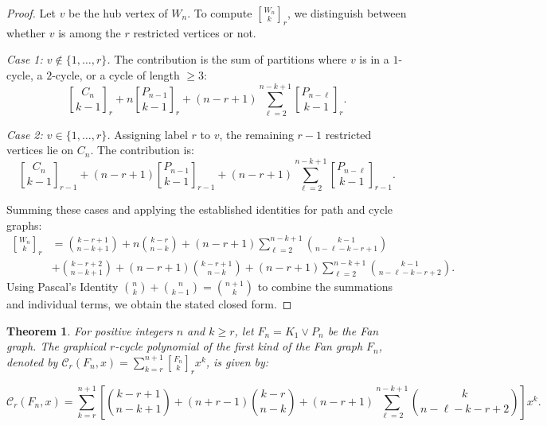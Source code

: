 \documentclass{amsart}
\newcounter{cases}
\newtheorem{theorem}{Theorem}[section]
\theoremstyle{definition}
\begin{document}
\begin{proof}
Let $v$ be the hub vertex of $W_n$. To compute ${W_n \brack k}_r$, we distinguish between whether $v$ is among the $r$ restricted vertices or not.

\textit{Case 1: $v \notin \{1, \dots, r\}$.} The contribution is the sum of partitions where $v$ is in a $1$-cycle, a $2$-cycle, or a cycle of length $\geq 3$:
\[ {C_n \brack k-1}_r + n{P_{n-1} \brack k-1}_r + (n-r+1)\sum_{\ell=2}^{n-k+1}{P_{n-\ell} \brack k-1}_{r}. \]

\textit{Case 2: $v \in \{1, \dots, r\}$.} Assigning label $r$ to $v$, the remaining $r-1$ restricted vertices lie on $C_n$. The contribution is:
\[ {C_n \brack k-1}_{r-1} + (n-r+1){P_{n-1} \brack k-1}_{r-1} + (n-r+1)\sum_{\ell=2}^{n-k+1}{P_{n-\ell} \brack k-1}_{r-1}. \]

Summing these cases and applying the established identities for path and cycle graphs:
\begin{align*}
{W_n \brack k}_r &= \binom{k-r+1}{n-k+1} + n\binom{k-r}{n-k} + (n-r+1)\sum_{\ell=2}^{n-k+1}\binom{k-1}{n-\ell-k-r+1} \\
&+ \binom{k-r+2}{n-k+1} + (n-r+1)\binom{k-r+1}{n-k} + (n-r+1)\sum_{\ell=2}^{n-k+1}\binom{k-1}{n-\ell-k-r+2}.
\end{align*}
Using Pascal's Identity $\binom{n}{k} + \binom{n}{k-1} = \binom{n+1}{k}$ to combine the summations and individual terms, we obtain the stated closed form.
\end{proof}

\begin{theorem}\label{Fan}
For positive integers $n$ and $k \geq r$, let $F_n = K_1 \vee P_n$ be the Fan graph. The graphical $r$-cycle polynomial of the first kind of the Fan graph $F_n$, denoted by $\mathcal{C}_r(F_n, x) = \sum_{k=r}^{n+1} {F_n \brack k}_r x^k$, is given by:

\begin{equation*}
\mathcal{C}_r(F_n, x) = \sum_{k=r}^{n+1} \left[ \binom{k-r+1}{n-k+1} + (n+r-1) \binom{k-r}{n-k} + (n-r+1) \sum_{\ell=2}^{n-k+1} \binom{k}{n-\ell-k-r+2} \right] x^k.
\end{equation*}
\end{theorem}
\end{document}

